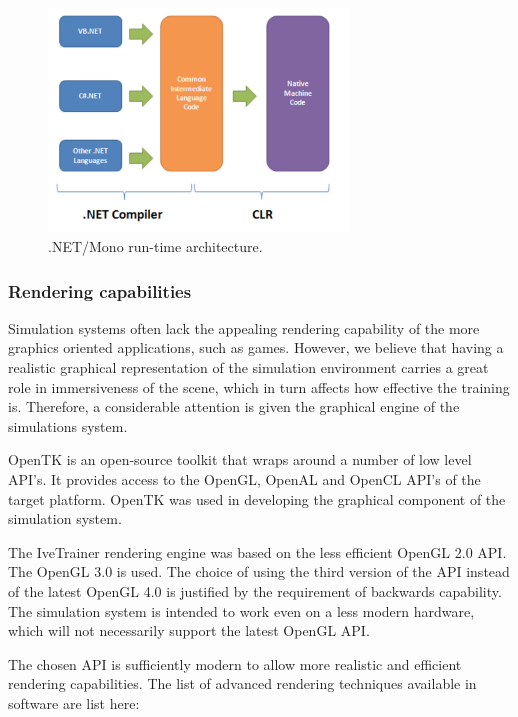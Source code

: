     \begin{figure}
    \begin{center}
    \includegraphics[width=80mm]{sections/methodology/images/software/dotnet-runtime.png}
    \caption[Entity component system use in BirthEngine.]{\label{software-dotnet-runtime} .NET/Mono run-time architecture.}
    \end{center}
    \end{figure}

  \subsubsection{Rendering capabilities}

    Simulation systems often lack the appealing rendering capability of the more graphics oriented applications, such as games. However, we believe that having a realistic graphical representation of the simulation environment carries a great role in immersiveness of the scene, which in turn affects how effective the training is. Therefore, a considerable attention is given the graphical engine of the simulations system.

    OpenTK \citep{opentk} is an open-source toolkit that wraps around a number of low level API's. It provides access to the OpenGL, OpenAL and OpenCL API's of the target platform. OpenTK was used in developing the graphical component of the simulation system.

    The IveTrainer rendering engine was based on the less efficient OpenGL 2.0 API. The OpenGL 3.0 is used. The choice of using the third version of the API instead of the latest OpenGL 4.0 is justified by the requirement of backwards capability. The simulation system is intended to work even on a less modern hardware, which will not necessarily support the latest OpenGL API.

    The chosen API is sufficiently modern to allow more realistic and efficient rendering capabilities. The list of advanced rendering techniques available in software are list here:

